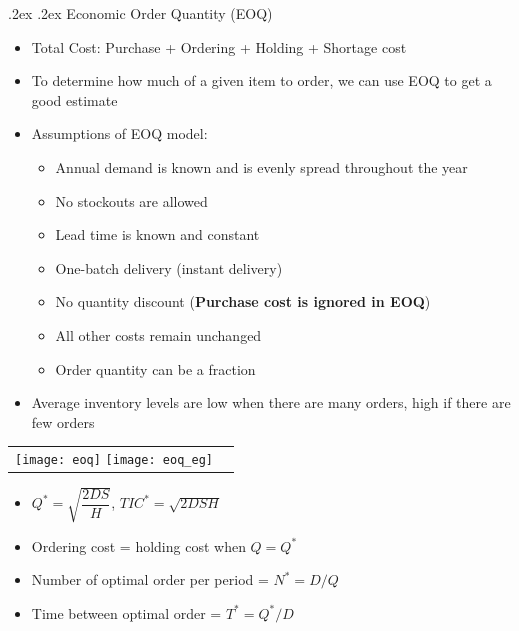 \documentclass[10pt,landscape,a4paper]{article}
\makeatletter
\renewcommand{\subsection}{\@startsection{subsection}{1}{0mm}%
	{.2ex}%
	{.2ex}%
	{\sffamily\bfseries}}
\makeatother
\begin{document}
\begin{multicols*}{4}
		\subsection{Economic Order Quantity (EOQ)}
		\begin{itemize}
			\item Total Cost: Purchase + Ordering + Holding + Shortage cost
			\item To determine how much of a given item to order, we can use EOQ to get a good estimate
			\item Assumptions of EOQ model:
			\begin{itemize}
				\item Annual demand is known and is evenly spread throughout the year
				\item No stockouts are allowed
				\item Lead time is known and constant
				\item One-batch delivery (instant delivery)
				\item No quantity discount (\textbf{Purchase cost is ignored in EOQ})
				\item All other costs remain unchanged
				\item Order quantity can be a fraction
			\end{itemize}
			\item Average inventory levels are low when there are many orders, high if there are few orders
		\end{itemize}
		\begin{tabular}{c c}
			\texttt{[image: eoq]}
			\texttt{[image: eoq\_eg]}
		\end{tabular}
		\begin{itemize}
			\item $Q^*=\sqrt{\dfrac{2DS}{H}}$,  $TIC^*=\sqrt{2DSH}$
			\item Ordering cost = holding cost when $Q = Q^*$
			\item Number of optimal order per period = $N^*=D/Q$
			\item Time between optimal order = $T^*=Q^*/D$ 
		\end{itemize}

\end{multicols*}
\end{document}
